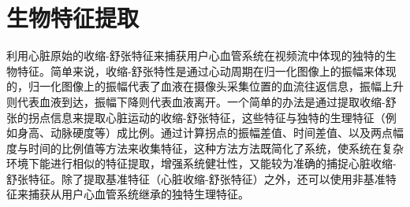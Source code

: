 \section{生物特征提取}
{利用心脏原始的收缩-舒张特征来捕获用户心血管系统在视频流中体现的独特的生物特征。简单来说，收缩-舒张特性是通过心动周期在归一化图像上的振幅来体现的，归一化图像上的振幅代表了血液在摄像头采集位置的血流往返信息，振幅上升则代表血液到达，振幅下降则代表血液离开。一个简单的办法是通过提取收缩-舒张的拐点信息来提取心脏运动的收缩-舒张特征，这些特征与独特的生理特征（例如身高、动脉硬度\cite{2002Determination}等）成比例。通过计算拐点的振幅差值、时间差值、以及两点幅度与时间的比例值等方法来收集特征，这种方法方法既简化了系统，使系统在复杂环境下能进行相似的特征提取，增强系统健壮性，又能较为准确的捕捉心脏收缩-舒张特征。除了提取基准特征（心脏收缩-舒张特征）之外，还可以使用非基准特征来捕获从用户心血管系统继承的独特生理特征。}
